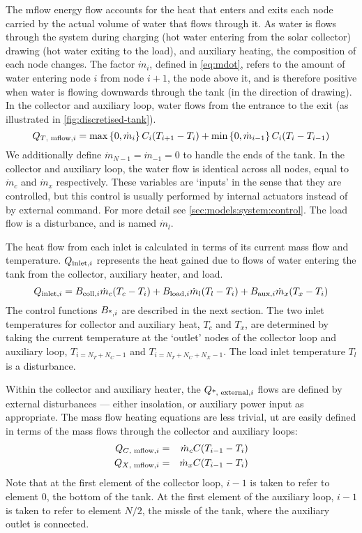 The mflow energy flow accounts for the heat that enters and exits each node carried by the actual volume of water that flows through it.
As water is flows through the system during charging (hot water entering from the solar collector) drawing (hot water exiting to the load), and auxiliary heating, the composition of each node changes.
The factor $\dot{m}_i$, defined in \autoref{eq:mdot}, refers to the amount of water entering node $i$ from node $i+1$, the node above it, and is therefore positive when water is flowing downwards through the tank (in the direction of drawing).
In the collector and auxiliary loop, water flows from the entrance to the exit (as illustrated in \autoref{fig:discretised-tank}).
\begin{equation}
   \label{eq:tank-Q-mflow}
   Q_{\text{$T$, mflow}, i} = \max \left\{ 0, \dot{m}_i \right\}     C_i (T_{i+1} - T_i)
             + \min \left\{ 0, \dot{m}_{i-1} \right\} C_i (T_i - T_{i-1})
\end{equation}
We additionally define $\dot{m}_{N-1} = \dot{m}_{-1} = 0$ to handle the ends of the tank.
In the collector and auxiliary loop, the water flow is identical across all nodes, equal to $\dot{m}_c$ and $\dot{m}_x$ respectively.
These variables are `inputs' in the sense that they are controlled, but this control is usually performed by internal actuators instead of by external command.
For more detail see \autoref{sec:models:system:control}.
The load flow is a disturbance, and is named $\dot{m}_l$.

The heat flow from each inlet is calculated in terms of its current mass flow and temperature.
$Q_{\text{inlet}, i}$ represents the heat gained due to flows of water entering the tank from the collector, auxiliary heater, and load.
\begin{equation}
   \label{eq:Q-inlet}
   Q_{\text{inlet}, i} = B_{\text{coll}, i} \dot{m}_c (T_c - T_i)
             + B_{\text{load}, i} \dot{m}_l (T_l - T_i)
             + B_{\text{aux}, i} \dot{m}_x (T_x - T_i)
\end{equation}
The control functions $B_{\text{*}, i}$ are described in the next section.
The two inlet temperatures for collector and auxiliary heat, $T_c$ and $T_x$, are determined by taking the current temperature at the `outlet' nodes of the collector loop and auxiliary loop, $T_{i=N_T+N_C-1}$ and $T_{i=N_T+N_C+N_X-1}$.
The load inlet temperature $T_l$ is a disturbance.

Within the collector and auxiliary heater, the $Q_{\text{*, external}, i}$ flows are defined by external disturbances --- either insolation, or auxiliary power input as appropriate.
The mass flow heating equations are less trivial, ut are easily defined in terms of the mass flows through the collector and auxiliary loops:
\begin{eqnarray}
   Q_{\text{$C$, mflow}, i} &=& \dot{m}_c C (T_{i-1} - T_i)
   \\
   Q_{\text{$X$, mflow}, i} &=& \dot{m}_x C (T_{i-1} - T_i)
\end{eqnarray}
Note that at the first element of the collector loop, $i-1$ is taken to refer to element 0, the bottom of the tank.
At the first element of the auxiliary loop, $i-1$ is taken to refer to element $N/2$, the missle of the tank, where the auxiliary outlet is connected.

